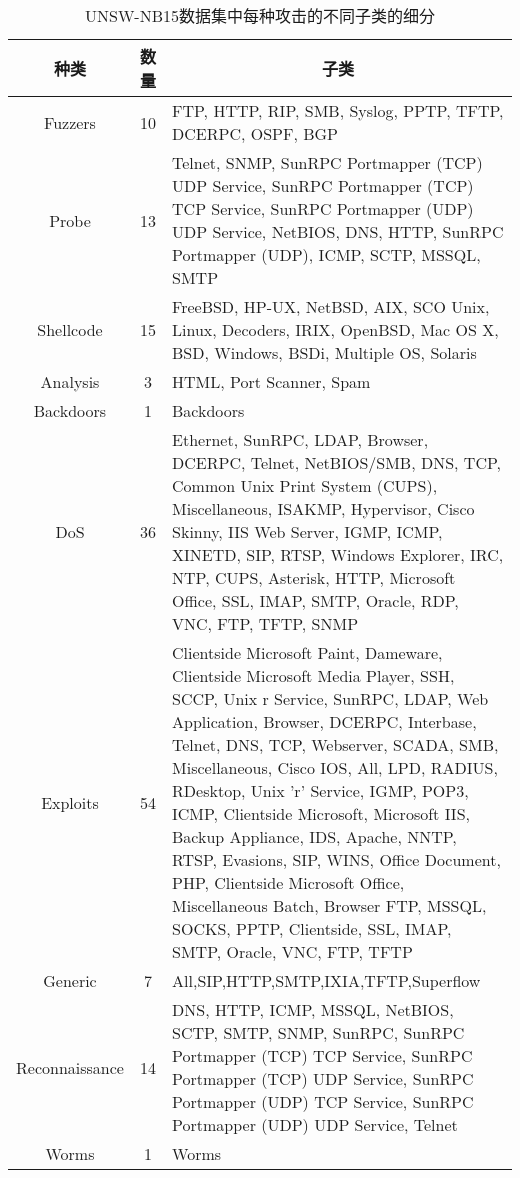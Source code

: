 \begin{table}[htbp]
  \caption{UNSW-NB15数据集中每种攻击的不同子类的细分}
  \label{tab:UNSW-NB15_class}
  \begin{tabularx}{\textwidth}{@{}ccX@{}}
  \toprule
    \multicolumn{1}{c}{\textbf{种类}} & \multicolumn{1}{c}{\textbf{数量}} & \multicolumn{1}{c}{\textbf{子类}}\\
  \midrule
    Fuzzers & 10 & FTP, HTTP, RIP, SMB, Syslog, PPTP, TFTP, DCERPC, OSPF, BGP\\
    Probe & 13 & Telnet, SNMP, SunRPC Portmapper (TCP) UDP Service, SunRPC Portmapper (TCP) TCP Service, SunRPC Portmapper (UDP) UDP Service, NetBIOS, DNS, HTTP,
    SunRPC Portmapper (UDP), ICMP, SCTP, MSSQL, SMTP\\
    Shellcode & 15 & FreeBSD, HP-UX, NetBSD, AIX, SCO Unix, Linux, Decoders, IRIX, OpenBSD, Mac OS X, BSD, Windows, BSDi, Multiple OS, Solaris\\
    Analysis & 3 & HTML, Port Scanner, Spam\\
    Backdoors & 1 & Backdoors\\
    DoS & 36 & Ethernet, SunRPC, LDAP, Browser, DCERPC, Telnet, NetBIOS/SMB, DNS, TCP, Common Unix Print System (CUPS), Miscellaneous, ISAKMP, Hypervisor, 
    Cisco Skinny, IIS Web Server, IGMP, ICMP, XINETD, SIP, RTSP, Windows Explorer, IRC, NTP, CUPS, Asterisk, HTTP, Microsoft Office, SSL, IMAP, SMTP, Oracle, RDP, VNC, FTP, TFTP, SNMP\\
    Exploits & 54 &Clientside Microsoft Paint, Dameware, Clientside Microsoft Media Player, SSH, SCCP, Unix r Service, SunRPC, LDAP, Web Application, Browser, DCERPC, Interbase, Telnet, DNS, TCP, Webserver, SCADA, SMB, Miscellaneous, Cisco IOS, All, LPD, RADIUS, RDesktop, Unix 'r' Service, IGMP, POP3, ICMP, Clientside Microsoft, Microsoft IIS, Backup Appliance, IDS, Apache, NNTP, RTSP, Evasions, SIP, WINS, Office Document, PHP, Clientside Microsoft Office, Miscellaneous Batch, Browser FTP, MSSQL, SOCKS, PPTP, Clientside, SSL, IMAP, SMTP, Oracle, VNC, FTP, TFTP\\
    Generic& 7 &All,SIP,HTTP,SMTP,IXIA,TFTP,Superflow\\
    Reconnaissance& 14 &DNS, HTTP, ICMP, MSSQL, NetBIOS, SCTP, SMTP, SNMP, SunRPC, SunRPC Portmapper (TCP) TCP Service, SunRPC Portmapper (TCP) UDP Service, SunRPC Portmapper (UDP) TCP Service, SunRPC Portmapper (UDP) UDP Service, Telnet\\
    Worms&1&Worms\\
    \bottomrule
  \end{tabularx}
\end{table}



